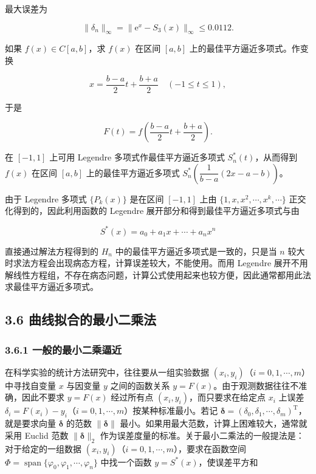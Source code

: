 最大误差为

\[
\|\delta_n\|_\infty=\|\mathrm e^x-S_3(x)\|_\infty\leqslant0.0112.
\]

如果 \(f(x)\in C[a,b]\)，求 \(f(x)\) 在区间 \([a,b]\) 上的最佳平方逼近多项式。作变换

\[
x=\frac{b-a}{2}t+\frac{b+a}{2}\quad(-1\leqslant t\leqslant1),
\]

于是

\[
F(t)=f\left(\frac{b-a}{2}t+\frac{b+a}{2}\right).
\]

在 \([-1,1]\) 上可用 Legendre 多项式作最佳平方逼近多项式 \(S_n^*(t)\)，从而得到 \(f(x)\) 在区间 \([a,b]\) 上的最佳平方逼近多项式 \(S_n^*\left(\dfrac1{b-a}(2x-a-b)\right)\)。

由于 Legendre 多项式 \(\{P_k(x)\}\) 是在区间 \([-1,1]\) 上由 \(\{1,x,x^2,\cdots,x^k,\cdots\}\) 正交化得到的，因此利用函数的 Legendre 展开部分和得到最佳平方逼近多项式与由

\[
S^*(x)=a_0+a_1x+\cdots+a_nx^n
\]

直接通过解法方程得到的 \(H_n\) 中的最佳平方逼近多项式是一致的，只是当 \(n\) 较大时求法方程会出现病态方程，计算误差较大，不能使用。而用 Legendre 展开不用解线性方程组，不存在病态问题，计算公式使用起来也较方便，因此通常都用此法求最佳平方逼近多项式。

\subsection{3.6 曲线拟合的最小二乘法}\label{ch03b-ux66f2ux7ebfux62dfux5408ux7684ux6700ux5c0fux4e8cux4e58ux6cd5}

\subsubsection{3.6.1 一般的最小二乘逼近}\label{ch03b-ux4e00ux822cux7684ux6700ux5c0fux4e8cux4e58ux903cux8fd1}

在科学实验的统计方法研究中，往往要从一组实验数据 \((x_i,y_i)\)（\(i=0,1,\cdots,m\)）中寻找自变量 \(x\) 与因变量 \(y\) 之间的函数关系 \(y=F(x)\)。由于观测数据往往不准确，因此不要求 \(y=F(x)\) 经过所有点 \((x_i,y_i)\)，而只要求在给定点 \(x_i\) 上误差 \(\delta_i=F(x_i)-y_i\)（\(i=0,1,\cdots,m\)）按某种标准最小。若记 \(\boldsymbol\delta=(\delta_0,\delta_1,\cdots,\delta_m)^{\mathrm T}\)，就是要求向量 \(\boldsymbol\delta\) 的范数 \(\|\boldsymbol\delta\|\) 最小。如果用最大范数，计算上困难较大，通常就采用 Euclid 范数 \(\|\boldsymbol\delta\|_2\) 作为误差度量的标准。关于最小二乘法的一般提法是：对于给定的一组数据 \((x_i,y_i)\)（\(i=0,1,\cdots,m\)），要求在函数空间 \(\Phi=\operatorname{span}\{\varphi_0,\varphi_1,\cdots,\varphi_n\}\) 中找一个函数 \(y=S^*(x)\)，使误差平方和

